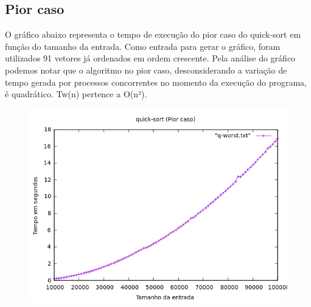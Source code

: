 \subsection{Pior caso}
O gráfico abaixo representa o tempo de execução do pior caso do quick-sort em função do tamanho da entrada. Como entrada para gerar o gráfico, foram utilizados 91 vetores já ordenados em ordem crescente. Pela análise do gráfico podemos notar que o algoritmo no pior caso, desconsiderando a variação de tempo gerada por processos concorrentes no momento da execução do programa, é quadrático. Tw(n) pertence a O(n²).
\begin{figure}[h]
    \centering
    \includegraphics[width=1\linewidth]{Imagens/q-worst.png}
\end{figure}

\newpage

